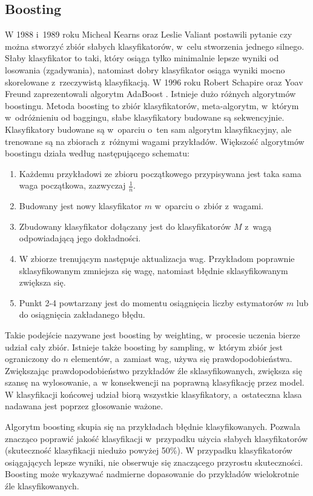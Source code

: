 \subsection{Boosting}
W 1988 i 1989 roku Micheal Kearns oraz Leslie Valiant postawili pytanie czy można stworzyć zbiór słabych klasyfikatorów, w celu stworzenia jednego silnego. Słaby klasyfikator to taki, który osiąga tylko minimalnie lepsze wyniki od losowania (zgadywania), natomiast dobry klasyfikator osiąga wyniki mocno skorelowane z rzeczywistą klasyfikacją. W 1996 roku Robert Schapire oraz Yoav Freund zaprezentowali algorytm AdaBoost \cite{adaboostc}. Istnieje dużo różnych algorytmów boostingu. 
Metoda boosting \cite{boostingc} to zbiór klasyfikatorów, meta-algorytm, w~którym w~odróżnieniu od baggingu, słabe klasyfikatory budowane są sekwencyjnie. Klasyfikatory budowane są w~oparciu o~ten sam algorytm klasyfikacyjny, ale trenowane są na zbiorach z~różnymi wagami przykładów. Większość algorytmów boostingu działa według następującego schematu:
\begin{enumerate}
	\item Każdemu przykładowi ze zbioru początkowego przypisywana jest taka sama waga początkowa, zazwyczaj $\frac{1}{n}$.
	\item Budowany jest nowy klasyfikator $m$ w~oparciu o~zbiór z~wagami.
	\item Zbudowany klasyfikator dołączany jest do klasyfikatorów $M$ z~wagą odpowiadającą jego dokładności.
	\item W zbiorze trenującym następuje aktualizacja wag. Przykładom poprawnie sklasyfikowanym zmniejsza się wagę, natomiast błędnie sklasyfikowanym zwiększa się.
	\item Punkt 2-4 powtarzany jest do momentu osiągnięcia liczby estymatorów $m$ lub do osiągnięcia zakładanego błędu. 
\end{enumerate}
Takie podejście nazywane jest boosting by weighting, w~procesie uczenia bierze udział cały zbiór. Istnieje także boosting by sampling, w~którym zbiór jest ograniczony do $n$ elementów, a~zamiast wag, używa się prawdopodobieństwa. Zwiększając prawdopodobieństwo przykładów źle sklasyfikowanych, zwiększa się szansę na wylosowanie, a~w konsekwencji na poprawną klasyfikację przez model. W klasyfikacji końcowej udział biorą wszystkie klasyfikatory, a~ostateczna klasa nadawana jest poprzez głosowanie ważone.\par
Algorytm boosting skupia się na przykładach błędnie klasyfikowanych. Pozwala znacząco poprawić jakość klasyfikacji w~przypadku użycia słabych klasyfikatorów (skuteczność klasyfikacji niedużo powyżej 50\%). W przypadku klasyfikatorów osiągających lepsze wyniki, nie obserwuje się znaczącego przyrostu skuteczności. Boosting może wykazywać nadmierne dopasowanie do przykładów wielokrotnie źle klasyfikowanych. \par
